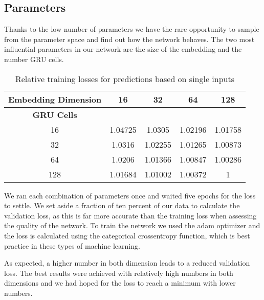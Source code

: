   \subsection{Parameters}
  \label{sub:parameters}

    Thanks to the low number of parameters we have the rare opportunity to sample from the parameter space and
    find out how the network behaves. The two most influential parameters in our network are the size of the 
    embedding and the number GRU cells.
  
  \begin{table}[htpb]
    \centering
    \label{tab:single}
    \begin{tabular}{| c | c | c | c | c |}
      \hline \textbf{Embedding Dimension}  & 16  & 32  & 64 & 128 \\ \hline
      \textbf{GRU Cells} &  & & & \\
      16 & \cellcolor[rgb]{0.9,0.6,0}1.04725 & \cellcolor[rgb]{0.8,0.65,0}  1.0305 & \cellcolor[rgb]{0.75,0.7,0}  1.02196 & \cellcolor[rgb]{0.7,0.75,0}  1.01758 \\ \hline
      32 & \cellcolor[rgb]{0.85,0.65,0} 1.0316 &\cellcolor[rgb]{0.8,0.7,0} 1.02255 &\cellcolor[rgb]{0.65,0.85,0}  1.01265 & \cellcolor[rgb]{0.6,0.9,0} 1.00873 \\ \hline
      64 &\cellcolor[rgb]{0.75,0.75,0}  1.0206 &\cellcolor[rgb]{0.65,0.8,0}  1.01366 & \cellcolor[rgb]{0.55,0.9,0} 1.00847 & \cellcolor[rgb]{0.5,0.95,0} 1.00286 \\ \hline
      128 &\cellcolor[rgb]{0.7,0.8,0}  1.01684 &\cellcolor[rgb]{0.6,0.85,0}  1.01002 & \cellcolor[rgb]{0.55,0.95,0} 1.00372 & \cellcolor[rgb]{0.5,1,0} 1 \\ \hline
    \end{tabular}
    \caption{Relative training losses for predictions based on single inputs}
  \end{table}

    We ran each combination of parameters once and waited five epochs for the loss to settle. We set aside
    a fraction of ten percent of our data to calculate the validation loss, as this is far more
    accurate than the training loss when assessing the quality of the network. To train the network
    we used the adam optimizer and the loss is calculated using the categorical crossentropy function, which
    is best practice in these types of machine learning.

    As expected, a higher number in both dimension leads to a reduced validation loss. The best results
    were achieved with relatively high numbers in both dimensions and we had hoped for the loss to
    reach a minimum with lower numbers.

